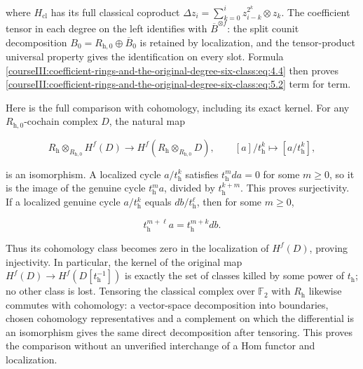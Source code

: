where \(H_{\mathrm{cl}}\) has its full classical coproduct
\(\Delta z_i=\sum_{k=0}^i z_{i-k}^{2^k}\otimes z_k\).
The coefficient tensor in each degree on the left identifies with
\(\overline B^{\otimes f}\): the split counit decomposition
\(B_0=R_{\mathrm h,0}\oplus\overline B_0\) is retained by localization, and the tensor-product universal property gives the identification on every slot. Formula \eqref{courseIII:coefficient-rings-and-the-original-degree-six-class:eq:4.4} then proves \eqref{courseIII:coefficient-rings-and-the-original-degree-six-class:eq:5.2} term for term.

Here is the full comparison with cohomology, including its exact kernel. For any \(R_{\mathrm h,0}\)-cochain complex \(D\), the natural map

\begin{equation}
R_{\mathrm h}\otimes_{R_{\mathrm h,0}}H^f(D)
       \longrightarrow H^f(R_{\mathrm h}\otimes_{R_{\mathrm h,0}}D),
 \qquad [a]/t_{\mathrm h}^k\longmapsto[a/t_{\mathrm h}^k],
 \label{courseIII:coefficient-rings-and-the-original-degree-six-class:eq:5.3}
\end{equation}

is an isomorphism. A localized cycle \(a/t_{\mathrm h}^k\) satisfies
\(t_{\mathrm h}^m da=0\) for some \(m\geq0\), so it is the image of the genuine cycle \(t_{\mathrm h}^m a\), divided by \(t_{\mathrm h}^{k+m}\). This proves surjectivity. If a localized genuine cycle \(a/t_{\mathrm h}^k\) equals \(db/t_{\mathrm h}^{\ell}\), then for some \(m\geq0\),

\begin{equation}
t_{\mathrm h}^{m+\ell}a=t_{\mathrm h}^{m+k}db.
 \label{courseIII:coefficient-rings-and-the-original-degree-six-class:eq:5.4}
\end{equation}

Thus its cohomology class becomes zero in the localization of \(H^f(D)\), proving injectivity. In particular, the kernel of the original map \(H^f(D)\to H^f(D[t_{\mathrm h}^{-1}])\) is exactly the set of classes killed by some power of \(t_{\mathrm h}\); no other class is lost. Tensoring the classical complex over \(\mathbb F_2\) with \(R_{\mathrm h}\) likewise commutes with cohomology: a vector-space decomposition into boundaries, chosen cohomology representatives and a complement on which the differential is an isomorphism gives the same direct decomposition after tensoring. This proves the comparison without an unverified interchange of a Hom functor and localization.

